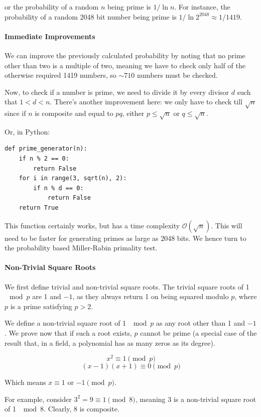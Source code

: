 \documentclass{article}
\begin{document}
or the probability of a random $n$ being prime is $1/ \ln{n}$. For instance, the probability of a
random 2048 bit number being prime is $1/ \ln{2^{2048}} \approx 1/1419$.

\paragraph{Immediate Improvements} We can improve the previously calculated probability by noting
that no prime other than two is a multiple of two, meaning we have to check only half of the
otherwise required 1419 numbers, so $\sim 710$ numbers must be checked.

Now, to check if a number is prime, we need to divide it by every divisor $d$ such that $1 < d < n$.
There's another improvement here: we only have to check till $\sqrt{n}$ since if $n$ is composite and
equal to $pq$, either $p \leq \sqrt{n}$ or $q \leq \sqrt{n}$.

Or, in Python:
\begin{verbatim}
def prime_generator(n):
    if n % 2 == 0:
        return False
    for i in range(3, sqrt(n), 2):
        if n % d == 0:
            return False
    return True
\end{verbatim}

This function certainly works, but has a time complexity $\mathcal{O}(\sqrt{n})$. This will need to
be faster for generating primes as large as 2048 bits. We hence turn to the probability based
Miller-Rabin primality test.

\paragraph{Non-Trivial Square Roots} We first define trivial and non-trivial square roots. The
trivial square roots of 1 $\mod{p}$ are 1 and $-1$, as they always return 1 on being squared modulo $p$, where
$p$ is a prime satisfying $p>2$.

We define a non-trivial square root of 1 $\mod{p}$ as any root other than 1 and $-1$. We prove now
that if such a root exists, $p$ cannot be prime (a special case of the result that, in a field, a
polynomial has as many zeros as its degree).

$$x^2 \equiv 1 \pmod{p}$$ $$(x-1)(x+1) \equiv 0 \pmod{p}$$

Which means $x \equiv 1$ or $-1 \pmod{p}$.

For example, consider $3^2 = 9 \equiv 1 \pmod{8}$, meaning 3 is a non-trivial square root of 1
$\mod{8}$. Clearly, 8 is composite.
\end{document}
